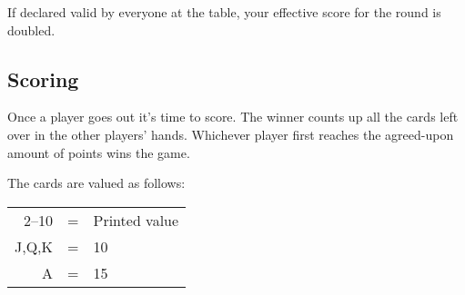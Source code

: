 If declared valid by everyone at the table, your effective score for the round is doubled.

\subsection{Scoring}
Once a player goes out it's time to score.
The winner counts up all the cards left over in the other players' hands.
Whichever player first reaches the agreed-upon amount of points wins the game.

The cards are valued as follows:
\begin{center}
    \begin{tabular}{rcl}
        2--10 & = & Printed value\\
        J,Q,K & = & 10\\
        A & = & 15
    \end{tabular}
\end{center}
